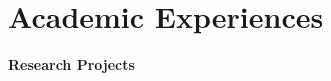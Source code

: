 \documentclass[a4paper,20pt]{article}
\begin{document}



\section{Academic Experiences}
\textbf{Research Projects}
\end{document}
